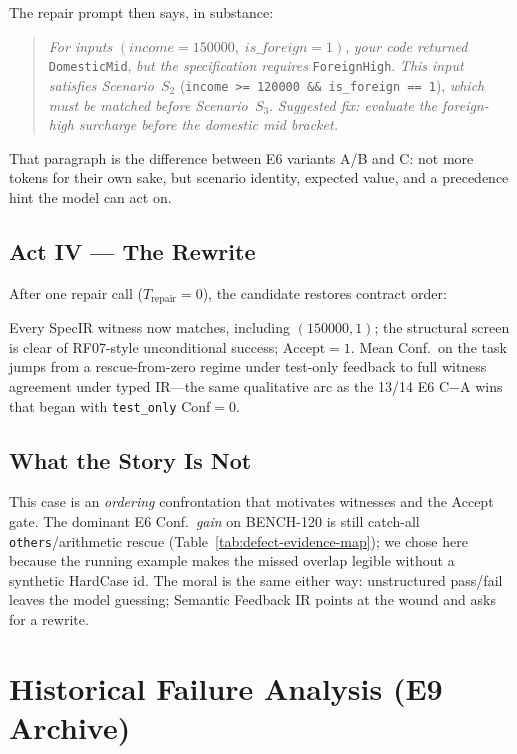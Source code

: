 The repair prompt then says, in substance:
\begin{quote}
\textit{For inputs} $(\mathit{income}{=}150000,\;\mathit{is\_foreign}{=}1)$,
\textit{your code returned} \texttt{DomesticMid}, \textit{but the
specification requires} \texttt{ForeignHigh}.
\textit{This input satisfies Scenario~$S_2$}
(\texttt{income >= 120000 \&\& is\_foreign == 1}),
\textit{which must be matched before Scenario~$S_3$}.
\textit{Suggested fix: evaluate the foreign-high surcharge before the
domestic mid bracket.}
\end{quote}
That paragraph is the difference between E6 variants A/B and C: not more
tokens for their own sake, but scenario identity, expected value, and a
precedence hint the model can act on.

\subsection*{Act IV --- The Rewrite}

After one repair call ($T_\text{repair}{=}0$), the candidate restores
contract order:


Every SpecIR witness now matches, including $(150000,1)$; the structural
screen is clear of RF07-style unconditional success; $\mathrm{Accept}{=}1$.
Mean Conf.\ on the task jumps from a rescue-from-zero regime under
test-only feedback to full witness agreement under typed IR---the same
qualitative arc as the 13/14 E6 C$-$A wins that began with
\texttt{test\_only} Conf${=}0$.

\subsection*{What the Story Is Not}

This case is an \emph{ordering} confrontation that motivates witnesses and
the Accept gate.
The dominant E6 Conf.\ \emph{gain} on BENCH-120 is still catch-all
\texttt{others}/arithmetic rescue
(Table~\ref{tab:defect-evidence-map}); we chose  here
because the running example makes the missed overlap legible without a
synthetic HardCase id.
The moral is the same either way: unstructured pass/fail leaves the model
guessing; Semantic Feedback IR points at the wound and asks for a rewrite.

\bigskip


\section{Historical Failure Analysis (E9 Archive)}
\label{sec:app:e9}

